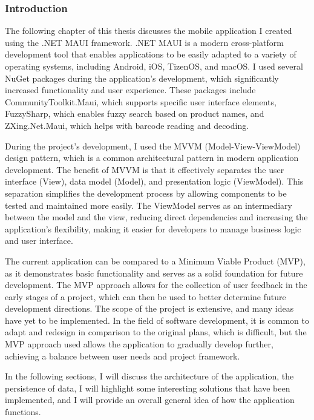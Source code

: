 \subsubsection{Introduction}

The following chapter of this thesis discusses the mobile application I created using the .NET MAUI framework. .NET MAUI is a modern cross-platform development tool that enables applications to be easily adapted to a variety of operating systems, including Android, iOS, TizenOS, and macOS. I used several NuGet packages during the application's development, which significantly increased functionality and user experience. These packages include CommunityToolkit.Maui, which supports specific user interface elements, FuzzySharp, which enables fuzzy search based on product names, and ZXing.Net.Maui, which helps with barcode reading and decoding.

During the project's development, I used the MVVM (Model-View-ViewModel) design pattern, which is a common architectural pattern in modern application development. The benefit of MVVM is that it effectively separates the user interface (View), data model (Model), and presentation logic (ViewModel). This separation simplifies the development process by allowing components to be tested and maintained more easily. The ViewModel serves as an intermediary between the model and the view, reducing direct dependencies and increasing the application's flexibility, making it easier for developers to manage business logic and user interface.
\newline\cite{maui}

The current application can be compared to a Minimum Viable Product (MVP), as it demonstrates basic functionality and serves as a solid foundation for future development. The MVP approach allows for the collection of user feedback in the early stages of a project, which can then be used to better determine future development directions. The scope of the project is extensive, and many ideas have yet to be implemented. In the field of software development, it is common to adapt and redesign in comparison to the original plans, which is difficult, but the MVP approach used allows the application to gradually develop further, achieving a balance between user needs and project framework. \cite{mvp}

In the following sections, I will discuss the architecture of the application, the persistence of data, I will highlight some interesting solutions that have been implemented, and I will provide an overall general idea of how the application functions.

